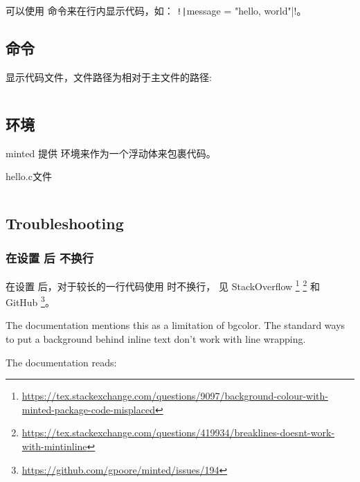 可以使用  命令来在行内显示代码，如：
\texttt!\texttt|message = "hello, world"|!。

\subsection{\protect{} 命令}

显示代码文件，文件路径为相对于主文件的路径:

\inputminted{c}{../examples/codelistings/helloworld.c}

\subsection{\protect{} 环境}

minted 提供  环境来作为一个浮动体来包裹代码。

\begin{listing}[H]
  \caption{hello.c文件}
  \inputminted{c}{../examples/codelistings/helloworld.c}
\end{listing}

\subsection{Troubleshooting}

\subsubsection{在设置 \protect{} 后 \protect{} 不换行}

在设置  后，对于较长的一行代码使用  时不换行，
见 StackOverflow
\footnote{\url{https://tex.stackexchange.com/questions/9097/background-colour-with-minted-package-code-misplaced}}
\footnote{\url{https://tex.stackexchange.com/questions/419934/breaklines-doesnt-work-with-mintinline}}
和 GitHub
\footnote{\url{https://github.com/gpoore/minted/issues/194}}。

The documentation mentions this as a limitation of bgcolor. The standard ways to put a background behind inline text don't work with line wrapping.

The documentation reads:

